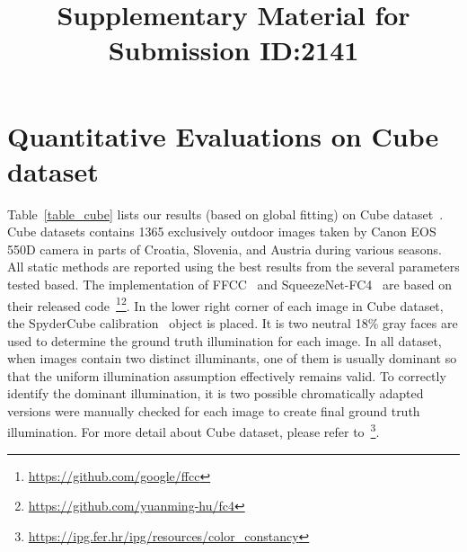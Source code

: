 \documentclass[10pt,twocolumn,letterpaper]{article}
\begin{document}
\title{Supplementary Material for Submission ID:2141}
\maketitle


\section{Quantitative Evaluations on Cube dataset}

Table~\ref{table_cube} lists our results (based on global fitting) on Cube dataset~\cite{DBLP:journals/corr/abs-1712-00436}.
Cube datasets contains 1365 exclusively outdoor images taken by Canon EOS 550D camera in
parts of Croatia, Slovenia, and Austria during various seasons.
All static methods are reported using the best results from the several parameters tested based.
The implementation of FFCC~\cite{DBLP:journals/corr/BarronT16} and SqueezeNet-FC4~\cite{hu2017fc}
are based on their released code~\footnote{\href{url}{https://github.com/google/ffcc}}\footnote{\href{url}{https://github.com/yuanming-hu/fc4}}.
In the lower right corner of each image in Cube dataset,
the SpyderCube calibration~\cite{DBLP:journals/corr/abs-1712-00436} object is placed.
It is two neutral 18\% gray faces are used to determine the ground truth illumination for each image.
In all dataset, when images contain two distinct illuminants,
one of them is usually dominant so that the uniform illumination assumption effectively remains valid.
To correctly identify the dominant illumination, it is two possible chromatically adapted versions were manually checked for each image
to create final ground truth illumination.
For more detail about Cube dataset, please refer to~\footnote{\href{url}{https://ipg.fer.hr/ipg/resources/color\_constancy}}.
\end{document}
